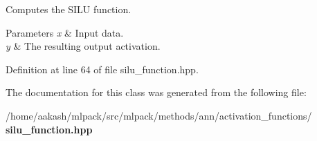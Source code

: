 Computes the S\+I\+LU function. 


\begin{DoxyParams}{Parameters}
{\em x} & Input data. \\
\hline
{\em y} & The resulting output activation. \\
\hline
\end{DoxyParams}


Definition at line 64 of file silu\+\_\+function.\+hpp.



The documentation for this class was generated from the following file\+:\begin{DoxyCompactItemize}
\item 
/home/aakash/mlpack/src/mlpack/methods/ann/activation\+\_\+functions/\textbf{ silu\+\_\+function.\+hpp}\end{DoxyCompactItemize}

